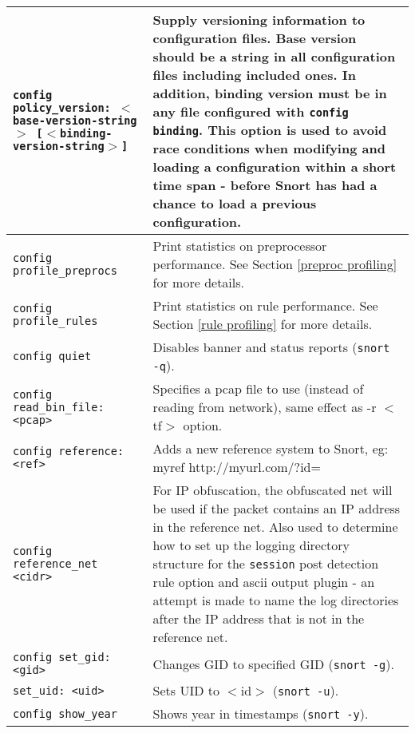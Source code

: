 \documentclass[english]{report}
\begin{document}
\begin{center}
\begin{longtable}[t]{| p{2.5in} | p{3.5in} |}
\hline
\texttt{config policy\_version: $<$base-version-string$>$ [$<$binding-version-string$>$]} &
Supply versioning information to configuration files.  Base version should be
a string in all configuration files including included ones.  In addition,
binding version must be in any file configured with \texttt{config binding}.
This option is used to avoid race conditions when modifying and loading a
configuration within a short time span - before Snort has had a chance to
load a previous configuration. \\

\hline
\texttt{config profile\_preprocs} & Print statistics on preprocessor
performance.  See Section \ref{preproc profiling} for more details. \\


\hline
\texttt{config profile\_rules} & Print statistics on rule performance.  See
Section \ref{rule profiling} for more details. \\

\hline
\texttt{config quiet}& Disables banner and status reports (\texttt{snort -q}).
\\

\hline
\texttt{config read\_bin\_file: <pcap>} & Specifies a pcap file to
use (instead of reading from network), same effect as -r $<$tf$>$ option.\\

\hline
\texttt{config reference: <ref>} & Adds a new reference system to Snort, eg:
myref http://myurl.com/?id=\\

\hline
\texttt{config reference\_net <cidr>} & For IP obfuscation, the obfuscated net
will be used if the packet contains an IP address in the reference net.  Also
used to determine how to set up the logging directory structure for the
\texttt{session} post detection rule option and ascii output plugin - an
attempt is made to name the log directories after the IP address that is not in
the reference net. \\

\hline
\texttt{config set\_gid: <gid>} & Changes GID to specified GID (\texttt{snort
-g}). \\

\hline
\texttt{set\_uid: <uid>} & Sets UID to $<$id$>$ (\texttt{snort -u}). \\

\hline
\texttt{config show\_year} & Shows year in timestamps (\texttt{snort -y}). \\


\end{longtable}
\end{center}
\end{document}
